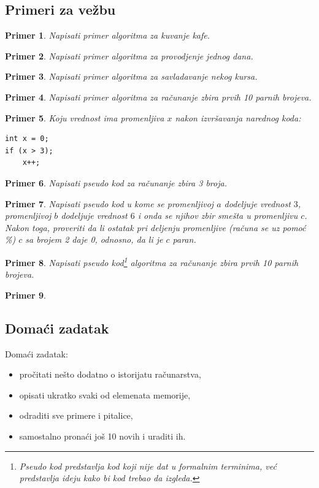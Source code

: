 \documentclass[a4paper]{article}
\newtheorem{primer}{Primer}[section]
\begin{document}
\subsection{Primeri za vežbu}
\begin{primer}
Napisati primer algoritma za kuvanje kafe.
\end{primer}
\begin{primer}
Napisati primer algoritma za provodjenje jednog dana.
\end{primer}
\begin{primer}
Napisati primer algoritma za savladavanje nekog kursa. 
\end{primer}
\begin{primer}
Napisati primer algoritma za računanje zbira prvih 10 parnih brojeva.
\end{primer}
\begin{primer}
Koju vrednost ima promenljiva $x$ nakon izvršavanja narednog koda:
\begin{verbatim}
int x = 0;
if (x > 3);
    x++;
\end{verbatim}
\end{primer}
\begin{primer}
Napisati pseudo kod za računanje zbira 3 broja.
\end{primer}
\begin{primer}
Napisati pseudo kod u kome se promenljivoj $a$ dodeljuje vrednost $3$, promenljivoj $b$ dodeljuje vrednost $6$ i onda se njihov zbir smešta u promenljivu $c$. Nakon toga, proveriti da li ostatak pri deljenju promenljive (računa se uz pomoć \%) $c$ sa brojem 2 daje 0, odnosno, da li je $c$ paran.
\end{primer}
\begin{primer}
Napisati pseudo kod\footnote{Pseudo kod predstavlja kod koji nije dat u formalnim terminima, već predstavlja ideju kako bi kod trebao da izgleda.} algoritma za računanje zbira prvih 10 parnih brojeva.
\end{primer}
\begin{primer}

\end{primer}

\subsection{Domaći zadatak}
Domaći zadatak:
\begin{itemize}
\item pročitati nešto dodatno o istorijatu računarstva, 
\item opisati ukratko svaki od elemenata memorije,
\item odraditi sve primere i pitalice,
\item samostalno pronaći još 10 novih i uraditi ih.
\end{itemize}
\newpage
\end{document}
